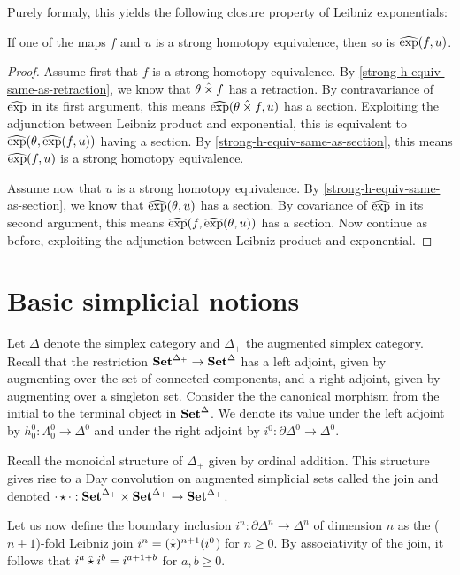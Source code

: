 \documentclass[reqno,10pt,a4paper,oneside]{amsart}
\begin{document}
Purely formaly, this yields the following closure property of Leibniz exponentials:

\begin{proposition}
\label{strong-h-equiv-closed-under-exp}
If one of the maps $f$ and $u$ is a strong homotopy equivalence, then so is $\operatorname{\widehat{exp}}(f, u)$.
\end{proposition}

\begin{proof}
Assume first that $f$ is a strong homotopy equivalence.
By \cref{strong-h-equiv-same-as-retraction}, we know that $\theta \mathbin{\hat{\times}} f$ has a retraction.
By contravariance of $\operatorname{\widehat{exp}}$ in its first argument, this means $\operatorname{\widehat{exp}}(\theta \mathbin{\hat{\times}} f, u)$ has a section.
Exploiting the adjunction between Leibniz product and exponential, this is equivalent to $\operatorname{\widehat{exp}}(\theta, \operatorname{\widehat{exp}}(f, u))$ having a section.
By \cref{strong-h-equiv-same-as-section}, this means $\operatorname{\widehat{exp}}(f, u)$ is a strong homotopy equivalence.

Assume now that $u$ is a strong homotopy equivalence.
By \cref{strong-h-equiv-same-as-section}, we know that $\operatorname{\widehat{exp}}(\theta, u)$ has a section.
By covariance of $\operatorname{\widehat{exp}}$ in its second argument, this means $\operatorname{\widehat{exp}}(f, \operatorname{\widehat{exp}}(\theta, u))$ has a section.
Now continue as before, exploiting the adjunction between Leibniz product and exponential.
\end{proof}

\section{Basic simplicial notions}

Let $\Delta$ denote the simplex category and $\Delta_+$ the augmented simplex category.
Recall that the restriction $\mathbf{Set}^{\Delta_+} \to \mathbf{Set}^{\Delta}$ has a left adjoint, given by augmenting over the set of connected components, and a right adjoint, given by augmenting over a singleton set.
Consider the the canonical morphism from the initial to the terminal object in $\mathbf{Set}^{\Delta}$.
We denote its value under the left adjoint by $h_0^0 : \Lambda_0^0 \to \Delta^0$ and under the right adjoint by $i^0 : \partial \Delta^0 \to \Delta^0$.

Recall the monoidal structure of $\Delta_+$ given by ordinal addition.
This structure gives rise to a Day convolution on augmented simplicial sets called the join and denoted $\mathop{\cdot} \star \mathop{\cdot} : \mathbf{Set}^{\Delta_+} \times \mathbf{Set}^{\Delta_+} \to \mathbf{Set}^{\Delta_+}$.

Let us now define the boundary inclusion $i^n : \partial \Delta^n \to \Delta^n$ of dimension $n$ as the ($n+1$)-fold Leibniz join $i^n = (\mathbin{\hat{\star}})^{n+1}(i^0$) for $n \geq 0$.
By associativity of the join, it follows that $i^a \mathbin{\hat{\star}} i^b = i^{a+1+b}$ for $a, b \geq 0$.
\end{document}

